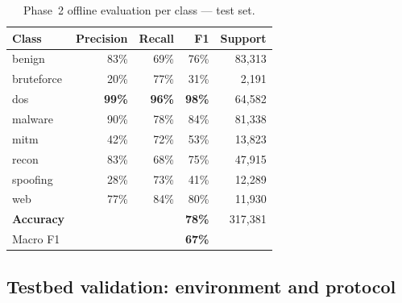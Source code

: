\documentclass[conference]{IEEEtran}
\begin{document}






\begin{table}[t]
\centering
\caption{Phase~2 offline evaluation per class — test set.}
\label{tab:phase2_offline}
\footnotesize
\begin{tabular}{@{}lrrrr@{}}
\toprule
\textbf{Class} & \textbf{Precision} & \textbf{Recall} & \textbf{F1} & \textbf{Support} \\ \midrule
benign      & 83\% & 69\% & 76\% & 83{,}313 \\
bruteforce  & 20\% & 77\% & 31\% &  2{,}191 \\
dos         & \textbf{99\%} & \textbf{96\%} & \textbf{98\%} & 64{,}582 \\
malware     & 90\% & 78\% & 84\% & 81{,}338 \\
mitm        & 42\% & 72\% & 53\% & 13{,}823 \\
recon       & 83\% & 68\% & 75\% & 47{,}915 \\
spoofing    & 28\% & 73\% & 41\% & 12{,}289 \\
web         & 77\% & 84\% & 80\% & 11{,}930 \\ \midrule
\textbf{Accuracy} & & & \textbf{78\%} & 317{,}381 \\
Macro F1    & & & \textbf{67\%} & \\
\bottomrule
\end{tabular}
\end{table}

\subsection{Testbed validation: environment and protocol}
\label{subsec:validation}
\end{document}
